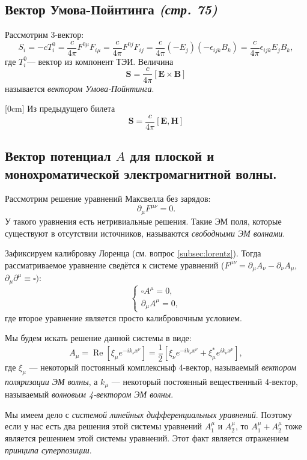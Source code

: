 \documentclass[a4paper,12pt]{article}
\begin{document}
\subsection{Вектор Умова-Пойнтинга \emph{(стр. 75)}}
Рассмотрим 3-вектор:
\[
S_i=-cT_i^0=\frac{c}{4\pi}F^{0\mu}F_{i\mu}=\frac{c}{4\pi}F^{0j}F_{ij}=
\frac{c}{4\pi}(-E_j)(-\epsilon_{ijk}B_k)=\frac{c}{4\pi}\epsilon_{ijk}E_j B_k
,\]
где $T_i^{0}$--- вектор из компонент ТЭИ.
Величина
\[
\mathbf{S}=\frac{c}{4\pi}\left[ \mathbf{E}\times\mathbf{B} \right] 
\]
называется \emph{вектором Умова-Пойнтинга}.

[0cm]
Из предыдущего билета \[\mathbf{S}=\frac{c}{4\pi}[\mathbf{E},\mathbf{H}]\]
\subsection{Вектор потенциал $A$ для плоской и монохроматической
электромагнитной
волны.}
Рассмотрим решение уравнений Максвелла без зарядов:
\[
\partial_\mu F^{\mu\nu}=0
.\] 
У такого уравнения есть нетривиальные решения. Такие ЭМ поля, которые
существуют в отсутствии источников, называются \emph{свободными ЭМ волнами}.

Зафиксируем калибровку Лоренца (см. вопрос \ref{subsec:lorentz}). Тогда
рассматриваемое уравнение сведётся к системе уравнений
($F^{\mu\nu}=\partial_\mu A_\nu-\partial_\nu A_\mu$, $\partial_\mu \partial^\mu
\equiv \square)$:
\[
\left\{
	\begin{aligned}
		\square A^\mu=0,\\
		\partial_\mu A^\mu=0,
	\end{aligned}
	\right.
\]
где второе уравнение является просто калибровочным условием.

Мы будем искать решение данной системы в виде:
\[
	A_\mu=\operatorname{Re}\left[ \xi_\mu e^{-ik_\nu x^\nu} \right]=
	\frac{1}{2}\left[ \xi_\nu e^{-i k_\nu x^\nu}+\xi^*_\mu e^{i k_\nu x^\nu} \right] 
	\tag{*}
	\label{eq:1}
,\]
где $\xi_\mu$ --- некоторый постоянный комплексныф 4-вектор, называемый
 \emph{вектором поляризации ЭМ волны}, а $k_\mu$ --- некоторый постоянный
 вещественный 4-вектор, называемый  \emph{волновым 4-вектором ЭМ волны}.

 Мы имеем дело с \emph{системой линейных дифференциальных уравнений}. Поэтому
 если у нас есть два решения этой системы уравнений $A_1^\mu$ и  $A_2^\mu$,
 то  $A_1^\mu+A_2^\mu$ тоже является решением этой системы уравнений. Этот
 факт является отражением  \emph{принципа суперпозиции}.
 
\end{document}
